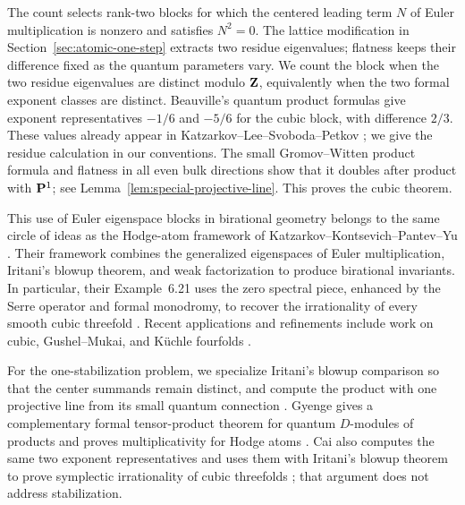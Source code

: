 The count selects rank-two blocks for which the centered leading term \(N\) of
Euler multiplication is nonzero and satisfies \(N^2=0\). The lattice
modification in Section~\ref{sec:atomic-one-step} extracts two residue
eigenvalues; flatness keeps their difference fixed as the quantum
parameters vary.  We count the block when the two residue eigenvalues are
distinct modulo \(\mathbf Z\), equivalently when the two formal exponent classes are
distinct.
Beauville's quantum product formulas give exponent representatives
\(-1/6\) and \(-5/6\) for the cubic block, with difference \(2/3\).
These values already appear in Katzarkov--Lee--Svoboda--Petkov
\cite[pp.~375--376]{InterpretationsSpectra}; we give the residue calculation
in our conventions.  The small Gromov--Witten product formula and flatness in all even bulk
directions show that it doubles after product with \(\mathbf P^1\); see
Lemma~\ref{lem:special-projective-line}. This proves the cubic theorem.

This use of Euler eigenspace blocks in birational geometry belongs to the same
circle of ideas as the Hodge-atom framework of
Katzarkov--Kontsevich--Pantev--Yu \cite{KKPYYu}.  Their framework combines the
generalized eigenspaces of Euler multiplication, Iritani's blowup theorem, and
weak factorization to produce birational invariants.  In particular, their
Example~6.21 uses the zero spectral piece, enhanced by the Serre operator and
formal monodromy, to recover the irrationality of every smooth cubic
threefold \cite[Example~6.21]{KKPYYu}.  Recent applications and refinements
include work on cubic, Gushel--Mukai, and K\"uchle fourfolds
\cite{GuereCubicFourfold,BenedettiManivelPerrin,
BenedettiFayGuereManivelPerrin}.

For the one-stabilization problem, we specialize Iritani's blowup
comparison so that the center summands remain distinct, and compute the
product with one projective line from its small quantum connection
\cite{IritaniBlowup,Behrend}.  Gyenge gives a complementary
formal tensor-product theorem for quantum \(D\)-modules of products and proves
multiplicativity for Hodge atoms \cite{GyengeProduct}.  Cai also
computes the same two exponent representatives and uses them with Iritani's
blowup theorem to prove symplectic irrationality of cubic threefolds
\cite{Cai}; that argument does not address stabilization.

